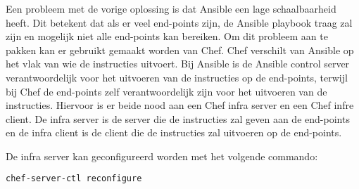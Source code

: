 \label{sec:Oplossing met Chef en Vault}
Een probleem met de vorige oplossing is dat Ansible een lage schaalbaarheid heeft. Dit betekent dat als er veel end-points zijn, de Ansible playbook traag zal zijn en mogelijk niet alle end-points kan bereiken.
Om dit probleem aan te pakken kan er gebruikt gemaakt worden van Chef. Chef verschilt van Ansible op het vlak van wie de instructies uitvoert. Bij Ansible is de Ansible control server verantwoordelijk voor het uitvoeren van de instructies op de end-points, terwijl bij Chef de end-points zelf verantwoordelijk zijn voor het uitvoeren van de instructies.
Hiervoor is er beide nood aan een Chef infra server en een Chef infre client. De infra server is de server die de instructies zal geven aan de end-points en de infra client is de client die de instructies zal uitvoeren op de end-points. \na

De infra server kan geconfigureerd worden met het volgende commando:
\begin{lstlisting}[language=bash]
    chef-server-ctl reconfigure
\end{lstlisting}

